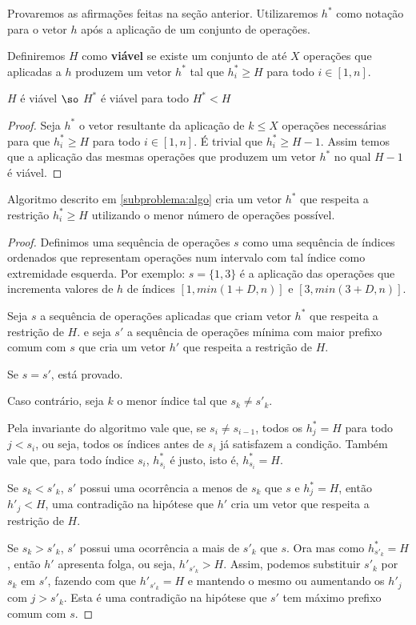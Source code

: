 Provaremos as afirmações feitas na seção anterior. Utilizaremos $h^*$ como notação para o vetor $h$ após a aplicação de um conjunto de operações.

Definiremos $H$ como \textbf{viável} se existe um conjunto de até $X$ operações que aplicadas a $h$ produzem um vetor $h^*$ tal que $h^*_i \geq H$ para todo $i \in [1, n]$.

\begin{prop}
    $H$ é viável $\so$ $H^*$ é viável para todo $H^* < H$
\end{prop}

\begin{proof}
    Seja $h^*$ o vetor resultante da aplicação de $k \leq X$ operações necessárias para que $h^*_i \geq H$ para todo $i \in [1, n]$. É trivial que $h^*_i \geq H - 1$. Assim temos que a aplicação das mesmas operações que produzem um vetor $h^*$ no qual $H - 1$ é viável.
\end{proof}

\begin{prop}
    Algoritmo descrito em \ref{subproblema:algo} cria um vetor $h^*$ que respeita a restrição $h^*_i \geq H$ utilizando o menor número de operações possível.
\end{prop}

\begin{proof}
    Definimos uma sequência de operações $s$ como uma sequência de índices ordenados que representam operações num intervalo com tal índice como extremidade esquerda. Por exemplo: $s = \{1, 3\}$ é a aplicação das operações que incrementa valores de $h$ de índices $[1, min(1 + D, n)]$ e $[3, min(3 + D, n)]$.
    
    Seja $s$ a sequência de operações aplicadas que criam vetor $h^*$ que respeita a restrição de $H$. e seja $s'$ a sequência de operações mínima com maior prefixo comum com $s$ que cria um vetor $h'$ que respeita a restrição de $H$.
    
    Se $s = s'$, está provado.

    Caso contrário, seja $k$ o menor índice tal que $s_k \neq s'_k$.

    Pela invariante do algoritmo vale que, se $s_i \neq s_{i - 1}$, todos os $h^*_j = H$ para todo $j < s_i$, ou seja, todos os índices antes de $s_i$ já satisfazem a condição. Também vale que, para todo índice $s_i$, $h^*_{s_i}$ é justo, isto é, $h^*_{s_i} = H$.

    Se $s_k < s'_k$, $s'$ possui uma ocorrência a menos de $s_k$ que $s$ e $h^*_j = H$, então $h'_j < H$, uma contradição na hipótese que $h'$ cria um vetor que respeita a restrição de $H$.

    Se $s_k > s'_k$, $s'$ possui uma ocorrência a mais de $s'_k$ que $s$. Ora mas como $h^*_{s'_k} = H$, então $h'$ apresenta folga, ou seja, $h'_{s'_k} > H$. Assim, podemos substituir $s'_k$ por $s_k$ em $s'$, fazendo com que $h'_{s'_k} = H$ e mantendo o mesmo ou aumentando os $h'_j$ com $j > s'_k$. Esta é uma contradição na hipótese que $s'$ tem máximo prefixo comum com $s$.

\end{proof}

